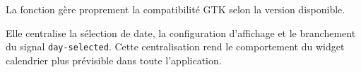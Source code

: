 La fonction gère proprement la compatibilité GTK selon la version disponible.

Elle centralise la sélection de date, la configuration d'affichage et le branchement du signal \texttt{day-selected}. Cette centralisation rend le comportement du widget calendrier plus prévisible dans toute l'application.

\newpage

